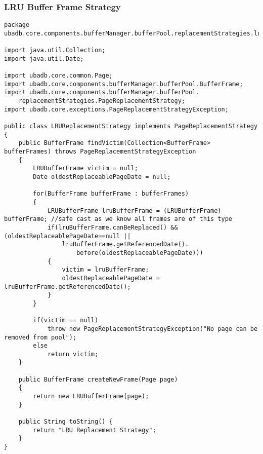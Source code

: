 \subsubsection{LRU Buffer Frame Strategy}

\begin{lstlisting}
package ubadb.core.components.bufferManager.bufferPool.replacementStrategies.lru;

import java.util.Collection;
import java.util.Date;

import ubadb.core.common.Page;
import ubadb.core.components.bufferManager.bufferPool.BufferFrame;
import ubadb.core.components.bufferManager.bufferPool.
	replacementStrategies.PageReplacementStrategy;
import ubadb.core.exceptions.PageReplacementStrategyException;

public class LRUReplacementStrategy implements PageReplacementStrategy
{       
    public BufferFrame findVictim(Collection<BufferFrame> bufferFrames) throws PageReplacementStrategyException
    {               
    	LRUBufferFrame victim = null;
		Date oldestReplaceablePageDate = null;
		
		for(BufferFrame bufferFrame : bufferFrames)
		{
			LRUBufferFrame lruBufferFrame = (LRUBufferFrame) bufferFrame; //safe cast as we know all frames are of this type
			if(lruBufferFrame.canBeReplaced() && (oldestReplaceablePageDate==null || 
				lruBufferFrame.getReferencedDate().
					before(oldestReplaceablePageDate)))
			{
				victim = lruBufferFrame;
				oldestReplaceablePageDate = lruBufferFrame.getReferencedDate();
			}
		}
		
		if(victim == null)
			throw new PageReplacementStrategyException("No page can be removed from pool");
		else
			return victim;
    }
    
    public BufferFrame createNewFrame(Page page) 
    {
    	return new LRUBufferFrame(page);                     
    }
    
    public String toString() {
    	return "LRU Replacement Strategy";
    }
}
\end{lstlisting}
